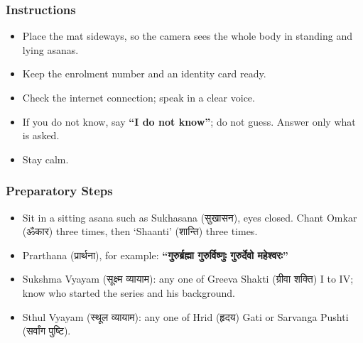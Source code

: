 \begin{frame}[fragile]\frametitle{Instructions}
    \begin{itemize}
        \item Place the mat sideways, so the camera sees the whole body in standing and lying asanas.
        \item Keep the enrolment number and an identity card ready.
        \item Check the internet connection; speak in a clear voice.
        \item If you do not know, say \textbf{``I do not know''}; do not guess. Answer only what is asked.
        \item Stay calm.
    \end{itemize}
\end{frame}

\begin{frame}[fragile]\frametitle{Preparatory Steps}
    \begin{itemize}
        \item Sit in a sitting asana such as Sukhasana (सुखासन), eyes closed. Chant Omkar (ॐकार) three times, then `Shaanti' (शान्ति) three times.
        \item Prarthana (प्रार्थना), for example: \textbf{“गुरुर्ब्रह्मा गुरुर्विष्णुः गुरुर्देवो महेश्वरः”}
        \item Sukshma Vyayam (सूक्ष्म व्यायाम): any one of Greeva Shakti (ग्रीवा शक्ति) I to IV; know who started the series and his background.
        \item Sthul Vyayam (स्थूल व्यायाम): any one of Hrid (हृदय) Gati or Sarvanga Pushti (सर्वांग पुष्टि).
    \end{itemize}
\end{frame}


